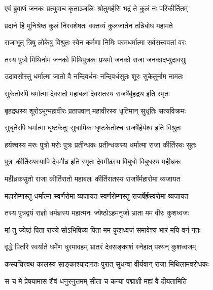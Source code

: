 
\twolineshloka
{एवं ब्रुवाणं जनकः प्रत्युवाच कृताञ्जलिः}
{श्रोतुमर्हसि भद्रं ते कुलं नः परिकीर्तितम्} %

\twolineshloka
{प्रदाने हि मुनिश्रेष्ठ कुलं निरवशेषतः}
{वक्तव्यं कुलजातेन तन्निबोध महामते} %

\twolineshloka
{राजाभूत् त्रिषु लोकेषु विश्रुतः स्वेन कर्मणा}
{निमिः परमधर्मात्मा सर्वसत्त्ववतां वरः} %

\twolineshloka
{तस्य पुत्रो मिथिर्नाम जनको मिथिपुत्रकः}
{प्रथमो जनको राजा जनकादप्युदावसुः} %

\twolineshloka
{उदावसोस्तु धर्मात्मा जातो वै नन्दिवर्धनः}
{नन्दिवर्धसुतः शूरः सुकेतुर्नाम नामतः} %

\twolineshloka
{सुकेतोरपि धर्मात्मा देवरातो महाबलः}
{देवरातस्य राजर्षेर्बृहद्रथ इति स्मृतः} %

\twolineshloka
{बृहद्रथस्य शूरोऽभून्महावीरः प्रतापवान्}
{महावीरस्य धृतिमान् सुधृतिः सत्यविक्रमः} %

\twolineshloka
{सुधृतेरपि धर्मात्मा धृष्टकेतुः सुधार्मिकः}
{धृष्टकेतोश्च राजर्षेर्हर्यश्व इति विश्रुतः} %

\twolineshloka
{हर्यश्वस्य मरुः पुत्रो मरोः पुत्रः प्रतीन्धकः}
{प्रतीन्धकस्य धर्मात्मा राजा कीर्तिरथः सुतः} %

\twolineshloka
{पुत्रः कीर्तिरथस्यापि देवमीढ इति स्मृतः}
{देवमीढस्य विबुधो विबुधस्य महीध्रकः} %

\twolineshloka
{महीध्रकसुतो राजा कीर्तिरातो महाबलः}
{कीर्तिरातस्य राजर्षेर्महारोमा व्यजायत} %

\twolineshloka
{महारोम्णस्तु धर्मात्मा स्वर्णरोमा व्यजायत}
{स्वर्णरोम्णस्तु राजर्षेर्ह्रस्वरोमा व्यजायत} %

\twolineshloka
{तस्य पुत्रद्वयं राज्ञो धर्मज्ञस्य महात्मनः}
{ज्येष्ठोऽहमनुजो भ्राता मम वीरः कुशध्वजः} %

\twolineshloka
{मां तु ज्येष्ठं पिता राज्ये सोऽभिषिच्य पिता मम}
{कुशध्वजं समावेश्य भारं मयि वनं गतः} %

\twolineshloka
{वृद्धे पितरि स्वर्याते धर्मेण धुरमावहम्}
{भ्रातरं देवसङ्काशं स्नेहात् पश्यन् कुशध्वजम्} %

\twolineshloka
{कस्यचित्त्वथ कालस्य साङ्काश्यादागतः पुरात्}
{सुधन्वा वीर्यवान् राजा मिथिलामवरोधकः} %

\twolineshloka
{स च मे प्रेषयामास शैवं धनुरनुत्तमम्}
{सीता च कन्या पद्माक्षी मह्यं वै दीयतामिति} %

